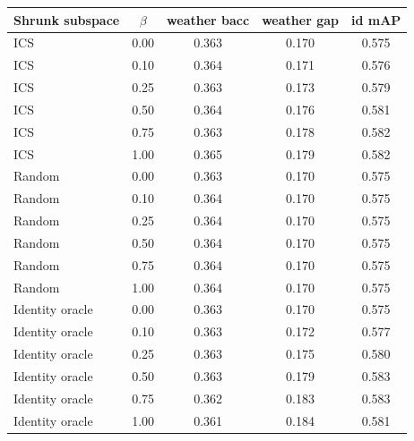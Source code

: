 \begin{tabular}{lcccc}
\toprule
Shrunk subspace & $\beta$ & weather bacc & weather gap & id mAP \\
\midrule
ICS & 0.00 & 0.363 & 0.170 & 0.575 \\
ICS & 0.10 & 0.364 & 0.171 & 0.576 \\
ICS & 0.25 & 0.363 & 0.173 & 0.579 \\
ICS & 0.50 & 0.364 & 0.176 & 0.581 \\
ICS & 0.75 & 0.363 & 0.178 & 0.582 \\
ICS & 1.00 & 0.365 & 0.179 & 0.582 \\
Random & 0.00 & 0.363 & 0.170 & 0.575 \\
Random & 0.10 & 0.364 & 0.170 & 0.575 \\
Random & 0.25 & 0.364 & 0.170 & 0.575 \\
Random & 0.50 & 0.364 & 0.170 & 0.575 \\
Random & 0.75 & 0.364 & 0.170 & 0.575 \\
Random & 1.00 & 0.364 & 0.170 & 0.575 \\
Identity oracle & 0.00 & 0.363 & 0.170 & 0.575 \\
Identity oracle & 0.10 & 0.363 & 0.172 & 0.577 \\
Identity oracle & 0.25 & 0.363 & 0.175 & 0.580 \\
Identity oracle & 0.50 & 0.363 & 0.179 & 0.583 \\
Identity oracle & 0.75 & 0.362 & 0.183 & 0.583 \\
Identity oracle & 1.00 & 0.361 & 0.184 & 0.581 \\
\bottomrule
\end{tabular}
